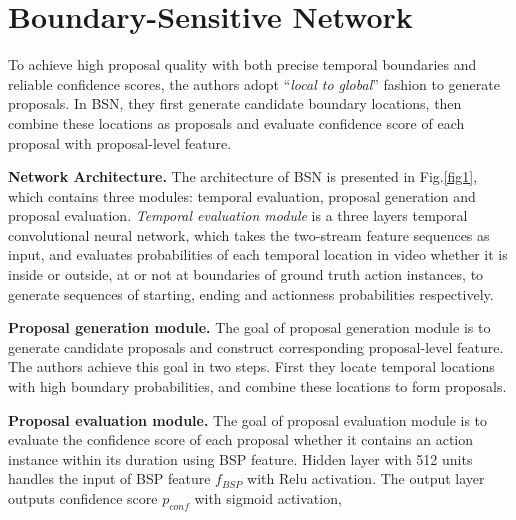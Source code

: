 \documentclass[10pt,twocolumn,letterpaper]{article}
\begin{document}
\section{Boundary-Sensitive Network}
To achieve high proposal quality with both precise temporal boundaries and reliable
confidence scores, the authors adopt ``\textit{local to global}'' fashion to generate proposals. In BSN, they
first generate candidate boundary locations, then combine these locations as proposals
and evaluate confidence score of each proposal with proposal-level feature.
\par
\noindent\textbf{Network Architecture.} The architecture of BSN is presented in Fig.\ref{fig1}, which contains three modules: temporal evaluation, proposal generation and proposal evaluation. \textit{Temporal evaluation module} is a three layers temporal convolutional neural network,
which takes the two-stream feature sequences as input, and evaluates probabilities of
each temporal location in video whether it is inside or outside, at or not at boundaries
of ground truth action instances, to generate sequences of starting, ending and actionness probabilities respectively.
\par
\noindent\textbf{Proposal generation module.} The goal of proposal generation module is to generate
candidate proposals and construct corresponding proposal-level feature. The authors achieve this
goal in two steps. First they locate temporal locations with high boundary probabilities,
and combine these locations to form proposals.
\par
\noindent\textbf{Proposal evaluation module.} The goal of proposal evaluation module is to evaluate
the confidence score of each proposal whether it contains an action instance within
its duration using BSP feature. Hidden layer with 512 units handles the input
of BSP feature $f_{BSP}$ with Relu activation. The output layer outputs confidence score
$p_{conf}$ with sigmoid activation,


\end{document}
